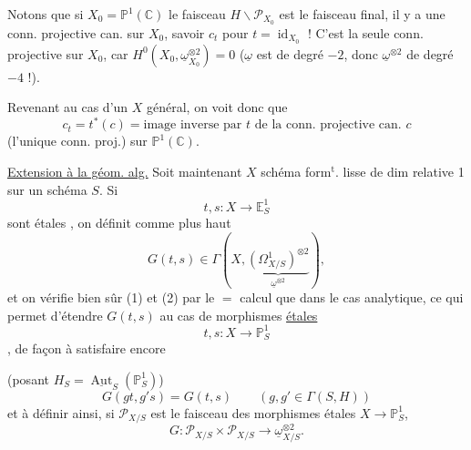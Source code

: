 Notons que si $X_0=\mathbb P^1(\mathbb C)$  le faisceau $H\backslash\mathcal P_{X_0}$ est le faisceau final,   il y a une conn. projective can.  sur $X_0$, savoir $c_t$ pour $t=\operatorname{id}_{X_0}$ ! C'est la seule conn. projective sur $X_0$, car $H^0(X_0,\underline\omega_{X_0}^{\otimes2})=0$ ($\underline\omega$ est de degré $-2$, donc $\underline\omega^{\otimes2}$ de degré $-4$ !).

Revenant au cas d'un $X$ général, on voit donc que
\[
c_t=t^*(c)=\text{image inverse par }t\text{ de la conn. projective can. }c
\]
(l'unique conn. proj.) sur $\mathbb P^1(\mathbb C)$.

\uline{Extension à la géom. alg.} Soit maintenant $X$ schéma form$^{\mathrm t}$. lisse de dim  relative 1 sur un schéma $S$. Si 
\[
t,s:X\longrightarrow\mathbb E^1_S
\]
sont étales , on définit comme plus haut
\[
G(t,s)\in\Gamma(X,\underbrace{(\Omega^1_{X/S})^{\otimes2}}_{\underline\omega^{\otimes2}}),
\]
et on vérifie bien sûr (1) et (2) par le $=$ calcul que dans le cas analytique, ce qui permet d'étendre $G(t,s)$ au cas de morphismes \uline{étales}
\[
t,s:X\longrightarrow\mathbb P^1_S
\]
, de façon à satisfaire encore 

(posant $H_S=\underline{\operatorname{Aut}}_S(\mathbb P^1_S)$)
\[
G(gt,g's)=G(t,s)\qquad(g,g'\in\Gamma(S,H))
\]
et à définir ainsi, si $\mathcal P_{X/S}$ est le faisceau  des morphismes étales $X\longrightarrow\mathbb P^1_S$,  
\[
G:\mathcal P_{X/S}\times\mathcal P_{X/S}\longrightarrow\underline\omega_{X/S}^{\otimes2}.
\]
